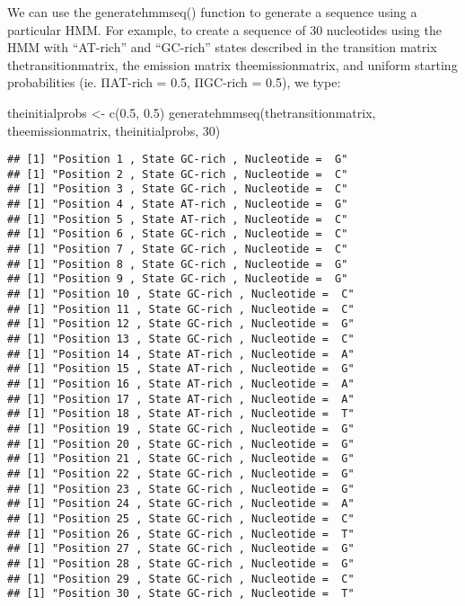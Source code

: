 \documentclass[
]{book}
\newenvironment{Shaded}{\begin{snugshade}}{\end{snugshade}}
\newcommand{\DecValTok}[1]{\textcolor[rgb]{0.00,0.00,0.81}{#1}}
\newcommand{\FloatTok}[1]{\textcolor[rgb]{0.00,0.00,0.81}{#1}}
\newcommand{\FunctionTok}[1]{\textcolor[rgb]{0.00,0.00,0.00}{#1}}
\newcommand{\NormalTok}[1]{#1}
\newcommand{\OtherTok}[1]{\textcolor[rgb]{0.56,0.35,0.01}{#1}}
\begin{document}
We can use the generatehmmseq() function to generate a sequence using a particular HMM. For example, to create a sequence of 30 nucleotides using the HMM with ``AT-rich'' and ``GC-rich'' states described in the transition matrix thetransitionmatrix, the emission matrix theemissionmatrix, and uniform starting probabilities (ie. ΠAT-rich = 0.5, ΠGC-rich = 0.5), we type:

\begin{Shaded}
\begin{Highlighting}[]
\NormalTok{theinitialprobs }\OtherTok{\textless{}{-}} \FunctionTok{c}\NormalTok{(}\FloatTok{0.5}\NormalTok{, }\FloatTok{0.5}\NormalTok{)}
\FunctionTok{generatehmmseq}\NormalTok{(thetransitionmatrix, theemissionmatrix, theinitialprobs, }\DecValTok{30}\NormalTok{)}
\end{Highlighting}
\end{Shaded}

\begin{verbatim}
## [1] "Position 1 , State GC-rich , Nucleotide =  G"
## [1] "Position 2 , State GC-rich , Nucleotide =  C"
## [1] "Position 3 , State GC-rich , Nucleotide =  C"
## [1] "Position 4 , State AT-rich , Nucleotide =  G"
## [1] "Position 5 , State AT-rich , Nucleotide =  C"
## [1] "Position 6 , State GC-rich , Nucleotide =  C"
## [1] "Position 7 , State GC-rich , Nucleotide =  C"
## [1] "Position 8 , State GC-rich , Nucleotide =  G"
## [1] "Position 9 , State GC-rich , Nucleotide =  G"
## [1] "Position 10 , State GC-rich , Nucleotide =  C"
## [1] "Position 11 , State GC-rich , Nucleotide =  C"
## [1] "Position 12 , State GC-rich , Nucleotide =  G"
## [1] "Position 13 , State GC-rich , Nucleotide =  C"
## [1] "Position 14 , State AT-rich , Nucleotide =  A"
## [1] "Position 15 , State AT-rich , Nucleotide =  G"
## [1] "Position 16 , State AT-rich , Nucleotide =  A"
## [1] "Position 17 , State AT-rich , Nucleotide =  A"
## [1] "Position 18 , State AT-rich , Nucleotide =  T"
## [1] "Position 19 , State GC-rich , Nucleotide =  G"
## [1] "Position 20 , State GC-rich , Nucleotide =  G"
## [1] "Position 21 , State GC-rich , Nucleotide =  G"
## [1] "Position 22 , State GC-rich , Nucleotide =  G"
## [1] "Position 23 , State GC-rich , Nucleotide =  G"
## [1] "Position 24 , State GC-rich , Nucleotide =  A"
## [1] "Position 25 , State GC-rich , Nucleotide =  C"
## [1] "Position 26 , State GC-rich , Nucleotide =  T"
## [1] "Position 27 , State GC-rich , Nucleotide =  G"
## [1] "Position 28 , State GC-rich , Nucleotide =  G"
## [1] "Position 29 , State GC-rich , Nucleotide =  C"
## [1] "Position 30 , State GC-rich , Nucleotide =  T"
\end{verbatim}
\end{document}
